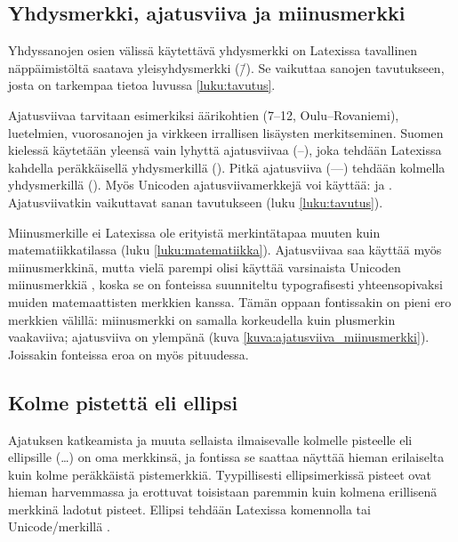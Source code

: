 \subsection{Yhdysmerkki, ajatusviiva ja miinusmerkki}

Yhdyssanojen osien välissä käytettävä yhdysmerkki on Latexissa
tavallinen näppäimistöltä saatava yleis\-yhdysmerkki (\=/). Se vaikuttaa
sanojen tavutukseen, josta on tarkempaa tietoa luvussa
\ref{luku:tavutus}.

Ajatusviivaa tarvitaan esimerkiksi äärikohtien (7--12,
Oulu--Rova\-niemi), luetelmien, vuorosanojen ja virkkeen irrallisen
lisäysten merkitseminen. Suomen kielessä käytetään yleensä vain lyhyttä
ajatusviivaa \mbox{(--)}, joka tehdään Latexissa kahdella peräkkäisellä
yhdysmerkillä (\koodi{--}). Pitkä ajatusviiva \mbox{(---)} tehdään
kolmella yhdysmerkillä (\koodi{---}). Myös Unicoden ajatusviivamerkkejä
voi käyttää:  ja .
Ajatusviivatkin vaikuttavat sanan tavutukseen (luku \ref{luku:tavutus}).

Miinusmerkille ei Latexissa ole erityistä merkintätapaa muuten kuin
matematiikkatilassa (luku \ref{luku:matematiikka}). Ajatusviivaa saa
käyttää myös miinusmerkkinä, mutta vielä parempi olisi käyttää
varsinaista Unicoden miinusmerkkiä , koska se
on fonteissa suunniteltu typografisesti yhteensopivaksi muiden
matemaattisten merkkien kanssa. Tämän oppaan fontissakin on pieni ero
merkkien välillä: miinusmerkki on samalla korkeudella kuin plusmerkin
vaakaviiva; ajatusviiva on ylempänä (kuva
\ref{kuva:ajatusviiva_miinusmerkki}). Joissakin fonteissa eroa on myös
pituudessa.


\subsection{Kolme pistettä eli ellipsi}

Ajatuksen katkeamista ja muuta sellaista ilmaisevalle kolmelle pisteelle
eli ellipsille (…) on oma merkkinsä, ja fontissa se saattaa näyttää
hieman erilaiselta kuin kolme peräkkäistä pistemerkkiä. Tyypillisesti
ellipsimerkissä pisteet ovat hieman harvemmassa ja erottuvat toisistaan
paremmin kuin kolmena erillisenä merkkinä ladotut pisteet. Ellipsi
tehdään Latexissa komennolla  tai Unicode\-/merkillä
.

